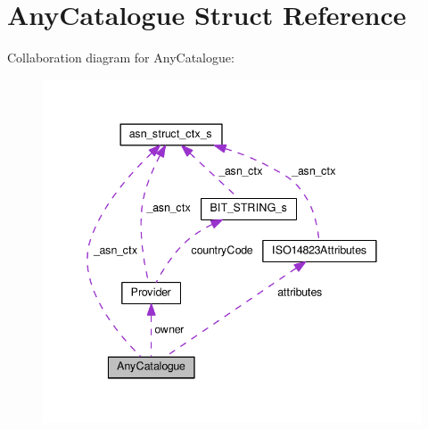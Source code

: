 \hypertarget{structAnyCatalogue}{}\section{Any\+Catalogue Struct Reference}
\label{structAnyCatalogue}


Collaboration diagram for Any\+Catalogue\+:\nopagebreak
\begin{figure}[H]
\begin{center}
\leavevmode
\includegraphics[width=341pt]{structAnyCatalogue__coll__graph}
\end{center}
\end{figure}
